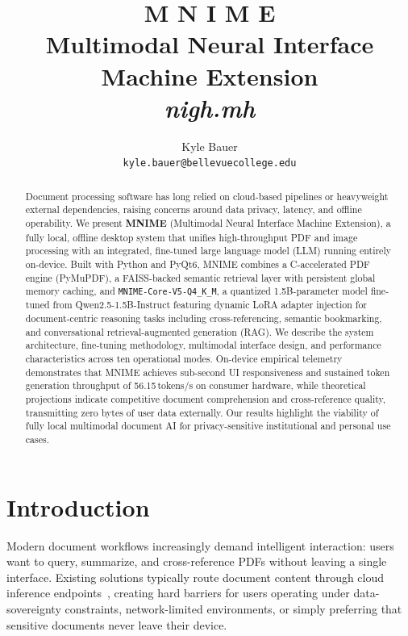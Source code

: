 \documentclass[11pt]{article}
\title{{\huge \textbf{M \hspace{2.0em} N \hspace{2.0em} I \hspace{2.0em} M \hspace{2.0em} E}}\\[0.45em]
{\large Multimodal Neural Interface Machine Extension}\\[0.25em]
{\normalsize \textit{nigh.mh}}}
\author{
  Kyle Bauer \\
  \texttt{kyle.bauer@bellevuecollege.edu}
}
\begin{document}
\maketitle

\begin{abstract}
Document processing software has long relied on cloud-based pipelines or
heavyweight external dependencies, raising concerns around data privacy,
latency, and offline operability.
We present \textbf{MNIME} (Multimodal Neural Interface Machine Extension),
a fully local, offline desktop system that unifies high-throughput PDF and
image processing with an integrated, fine-tuned large language model (LLM)
running entirely on-device.
Built with Python and PyQt6, MNIME combines a C-accelerated PDF engine
(PyMuPDF), a FAISS-backed semantic retrieval layer with persistent global memory caching, and
\texttt{MNIME-Core-V5-Q4\_K\_M}, a quantized 1.5B-parameter model
fine-tuned from Qwen2.5-1.5B-Instruct featuring dynamic LoRA adapter injection for document-centric reasoning tasks
including cross-referencing, semantic bookmarking, and conversational
retrieval-augmented generation (RAG).
We describe the system architecture, fine-tuning methodology, multimodal
interface design, and performance characteristics across ten operational modes.
On-device empirical telemetry demonstrates that MNIME achieves sub-second UI responsiveness
and sustained token generation throughput of 56.15\,tokens/s on consumer hardware,
while theoretical projections indicate competitive document comprehension and cross-reference
quality, transmitting zero bytes of user data externally.
Our results highlight the viability of fully local multimodal document AI
for privacy-sensitive institutional and personal use cases.
\end{abstract}

\section{Introduction}
\label{sec:intro}

Modern document workflows increasingly demand intelligent interaction: users
want to query, summarize, and cross-reference PDFs without leaving a single
interface.
Existing solutions typically route document content through cloud inference
endpoints~\cite{openai2024gpt4,gemini2025}, creating hard barriers for users
operating under data-sovereignty constraints, network-limited environments,
or simply preferring that sensitive documents never leave their device.
\end{document}
